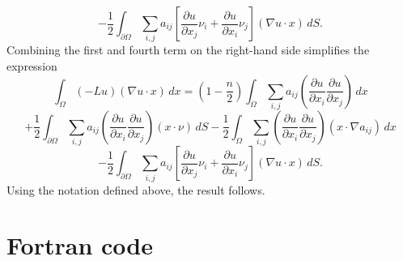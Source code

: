 $$- \frac{1}{2} \int_{\partial\Omega}
\sum_{i,j} a_{ij} \left[
\frac{\partial u}{\partial x_j} \nu_{i} +
\frac{\partial u}{\partial x_i} \nu_{j}
\right] (\nabla u\cdot x) \, dS.
$$
Combining the first and fourth term on the right-hand side
simplifies the expression
$$\int_{\Omega}(-Lu)(\nabla u\cdot x)\, dx
=
(1-\frac{n}{2}) \int_{\Omega}
\sum_{i,j} a_{ij} \left(
\frac{\partial u}{\partial x_i}
\frac{\partial u}{\partial x_j}
\right) \, dx
$$
$$
+
\frac{1}{2} \int_{\partial\Omega}
\sum_{i,j} a_{ij} \left(
\frac{\partial u}{\partial x_i}
\frac{\partial u}{\partial x_j}
\right) (x\cdot \nu ) \, dS
-
\frac{1}{2} \int_{\Omega}
\sum_{i,j} \left(
\frac{\partial u}{\partial x_i}
\frac{\partial u}{\partial x_j}
\right) (x\cdot  \nabla a_{ij}) \, dx
$$
$$
-
\frac{1}{2} \int_{\partial\Omega}
\sum_{i,j} a_{ij} \left[
\frac{\partial u}{\partial x_j} \nu_{i} +
\frac{\partial u}{\partial x_i} \nu_{j}
\right] (\nabla u\cdot x) \, dS.
$$
Using the notation defined above, the result follows.


%
%
%
\section*{Fortran code}\label{code}
%
%


 \begin{singlespace}
 \begin{small}
 \end{small}
 \end{singlespace}
